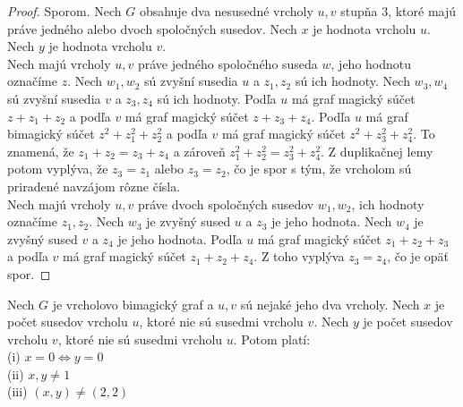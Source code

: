 \begin{proof} Sporom. Nech $G$ obsahuje dva nesusedné vrcholy $u,v$ stupňa 3, ktoré majú práve jedného alebo dvoch spoločných susedov. Nech $x$ je hodnota vrcholu $u$. Nech $y$ je hodnota vrcholu $v$. \\

Nech majú vrcholy $u,v$ práve jedného spoločného suseda $w$, jeho hodnotu označíme $z$. Nech $w_1, w_2$ sú zvyšní susedia $u$ a $z_1, z_2$ sú ich hodnoty. Nech $w_3, w_4$ sú zvyšní susedia $v$ a $z_3, z_4$ sú ich hodnoty. Podľa $u$ má graf magický súčet $z + z_1 + z_2$ a podľa $v$ má graf magický súčet $z + z_3 + z_4$. Podľa $u$ má graf bimagický súčet $z^2 + z^2_1 + z^2_2$ a podľa $v$ má graf magický súčet $z^2 + z^2_3 + z^2_4$. To znamená, že $z_1 + z_2 = z_3 + z_4$ a zároveň $z^2_1 + z^2_2 = z^2_3 + z^2_4$. Z duplikačnej lemy potom vyplýva, že $z_3 = z_1$ alebo $z_3 = z_2$, čo je spor s tým, že vrcholom sú priradené navzájom rôzne čísla. \\

Nech majú vrcholy $u,v$ práve dvoch spoločných susedov $w_1, w_2$, ich hodnoty označíme $z_1, z_2$. Nech $w_3$ je zvyšný sused $u$ a $z_3$ je jeho hodnota. Nech $w_4$ je zvyšný sused $v$ a $z_4$ je jeho hodnota. Podľa $u$ má graf magický súčet $z_1 + z_2 + z_3$ a podľa $v$ má graf magický súčet $z_1 + z_2 + z_4$. Z toho vyplýva $z_3 = z_4$, čo je opäť spor.
\end{proof}

\begin{subtheorem} Nech $G$ je vrcholovo bimagický graf a $u,v$ sú nejaké jeho dva vrcholy. Nech $x$ je počet susedov vrcholu $u$, ktoré nie sú susedmi vrcholu $v$. Nech $y$ je počet susedov vrcholu $v$, ktoré nie sú susedmi vrcholu $u$. Potom platí: \\
(i) $x = 0 \iff y = 0$ \\
(ii) $x,y \neq 1$ \\
(iii) $(x,y) \neq (2,2)$
\end{subtheorem}

